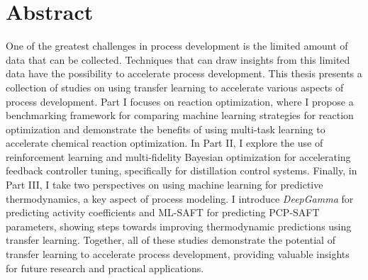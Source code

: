 \begingroup
\let\clearpage\relax
\let\cleardoublepage\relax
\let\cleardoublepage\relax

\chapter*{Abstract}

One of the greatest challenges in process development is the limited amount of data that can be collected. Techniques that can draw insights from this limited data have the possibility to accelerate process development. This thesis presents a collection of studies on using transfer learning to accelerate various aspects of process development. Part I focuses on reaction optimization, where I propose a benchmarking framework for comparing machine learning strategies for reaction optimization and demonstrate the benefits of using multi-task learning to accelerate chemical reaction optimization. In Part II, I explore the use of reinforcement learning and multi-fidelity Bayesian optimization for accelerating feedback controller tuning, specifically for distillation control systems. Finally, in Part III, I take two perspectives on using machine learning for predictive thermodynamics, a key aspect of process modeling. I introduce \textit{DeepGamma} for predicting activity coefficients and ML-SAFT for predicting PCP-SAFT parameters, showing steps towards improving thermodynamic predictions using transfer learning. Together, all of these studies demonstrate the potential of transfer learning to accelerate process development, providing valuable insights for future research and practical applications.

\vfill

\endgroup			

\vfill